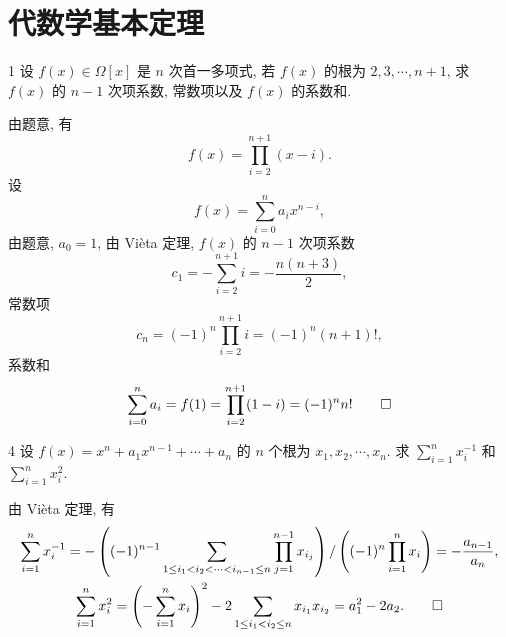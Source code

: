 
\renewcommand{\thesection}{1.7}

\section{代数学基本定理}\label{sec:1.7}

\begin{ex}{1}\label{ex:1.7.1}
    设 \(f(x)\in\Omega[x]\) 是 \(n\) 次首一多项式,
    若 \(f(x)\) 的根为 \(2,3,\cdots,n+1\),
    求 \(f(x)\) 的 \(n-1\) 次项系数, 常数项以及 \(f(x)\) 的系数和.
\end{ex}

\begin{solution}
    由题意, 有
    \[
    f(x)=\prod_{i=2}^{n+1}(x-i).
    \]
    设
    \[
    f(x)=\sum_{i=0}^{n}a_{i}x^{n-i},
    \]
    由题意, \(a_0=1\), 由 Vi\`eta 定理, \(f(x)\) 的 \(n-1\) 次项系数
    \[
    c_1=-\sum_{i=2}^{n+1}i=-\frac{n(n+3)}{2},
    \]
    常数项
    \[
    c_n=(-1)^n\prod_{i=2}^{n+1}i=(-1)^n(n+1)!,
    \]
    系数和
    \[
    \sum_{i=0}^{n}a_i=f(1)=\prod_{i=2}^{n+1}(1-i)=(-1)^{n}n!\qedhere
    \]
\end{solution}

\begin{ex}{4}\label{ex:1.7.4}
    设 \(f(x)=x^n+a_1x^{n-1}+\cdots+a_n\) 的 \(n\) 个根为 \(x_1,x_2,\cdots,x_n\).
    求 \(\displaystyle\sum_{i=1}^{n}x_i^{-1}\) 和 \(\displaystyle\sum_{i=1}^{n}x_i^2\).
\end{ex}

\begin{solution}
    由 Vi\`eta 定理, 有
    \begin{gather*}
    \sum_{i=1}^{n}x_i^{-1}
    =-\left((-1)^{n-1}\sum_{1\leq i_1<i_2<\cdots<i_{n-1}\leq n}\prod_{j=1}^{n-1}x_{i_j}\right)
    /\left((-1)^n\prod_{i=1}^{n}x_{i}\right)=-\frac{a_{n-1}}{a_n},\\
    \sum_{i=1}^{n}x_i^2
    =\left(-\sum_{i=1}^{n}x_i\right)^2-2\sum_{1\leq i_1<i_2\leq n}x_{i_1}x_{i_2}=a_1^2-2a_2.\qedhere
    \end{gather*}
\end{solution}